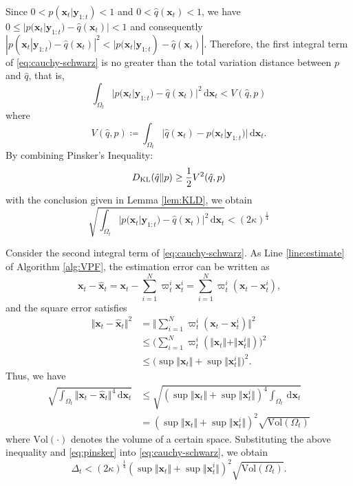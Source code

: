 \documentclass[10pt,twocolumn,twoside]{IEEEtran}
\newcommand{\cm}{\text{,}} %
\newcommand{\fs}{\text{.}} %
\newcommand{\x}{{ \bm{x} }}
\newcommand{\y}{{ \bm{y} }}
\begin{document}
\begin{appendices}
Since $0<p(\x_t|\y_{1:t})<1$ and $0<\hat{q}(\x_t)<1$, we have $0\leq|p(\x_t|\y_{1:t})-\hat{q}(\x_t)|<1$ and consequently $|p(\x_t|\y_{1:t})-\hat{q}(\x_t)|^2<|p(\x_t|\y_{1:t})-\hat{q}(\x_t)|$. Therefore, the first integral term of \eqref{eq:cauchy-schwarz} is no greater than the total variation distance between $p$ and $\hat{q}$, that is,
$$
\int_{\Omega_t}{|p(\x_t|\y_{1:t})-\hat{q}(\x_t)|^2}\,\mathrm{d}\x_t < V(\hat{q},p)
$$
where
$$
V(\hat{q},p) \coloneqq \int_{\Omega_t}{|\hat{q}(\x_t)-p(\x_t|\y_{1:t})|}\,\mathrm{d}\x_t \fs
$$
By combining Pinsker's Inequality:
$$
D_{\rm KL}(\hat{q}\Vert p) \geq \frac{1}{2}V^2(\hat{q},p)
$$
with the conclusion given in Lemma \ref{lem:KLD}, we obtain
\begin{equation} \label{eq:pinsker}
    \sqrt{\int_{\Omega_t}{|p(\x_t|\y_{1:t})-\hat{q}(\x_t)|^2}\,\mathrm{d}\x_t} < (2\kappa)^\frac{1}{4}
\end{equation}

Consider the second integral term of \eqref{eq:cauchy-schwarz}. As Line \ref{line:estimate} of Algorithm \ref{alg:VPF}, the estimation error can be written as
$$
\x_t-\hat\x_t = \x_t-\sum_{i=1}^N\varpi_t^i\x_t^i = \sum_{i=1}^N\varpi_t^i(\x_t-\x_t^i) \cm
$$
and the square error satisfies
\begin{equation*}
\begin{split}
    \Vert\x_t-\hat\x_t\Vert^2 &= \Big\Vert\sum_{i=1}^N\varpi_t^i(\x_t-\x_t^i)\Big\Vert^2\\
    &\leq \Big(\sum_{i=1}^N\varpi_t^i(\Vert\x_t\Vert+\Vert\x_t^i\Vert)\Big)^2 \\
    &\leq \Big(\sup\Vert\x_t\Vert+\sup\Vert\x_t^i\Vert\Big)^2 \fs
\end{split}
\end{equation*}
Thus, we have
\begin{equation*}
\begin{split}
    \sqrt{\int_{\Omega_t}{\Vert\x_t-\hat\x_t\Vert^4}\,\mathrm{d}\x_t} &\leq \sqrt{(\sup\Vert\x_t\Vert+\sup\Vert\x_t^i\Vert)^4\int_{\Omega_t}\,\mathrm{d}\x_t} \\
    &= (\sup\Vert\x_t\Vert+\sup\Vert\x_t^i\Vert)^2\sqrt{\mathrm{Vol}(\Omega_t)}
\end{split}
\end{equation*}
where $\mathrm{Vol}(\cdot)$ denotes the volume of a certain space. Substituting the above inequality and \eqref{eq:pinsker} into \eqref{eq:cauchy-schwarz}, we obtain 
\begin{equation} \label{ineq1}
    \Delta_t < (2\kappa)^\frac{1}{4}(\sup\Vert\x_t\Vert+\sup\Vert\x_t^i\Vert)^2\sqrt{\mathrm{Vol}(\Omega_t)} \fs
\end{equation}


\end{appendices}
\end{document}

